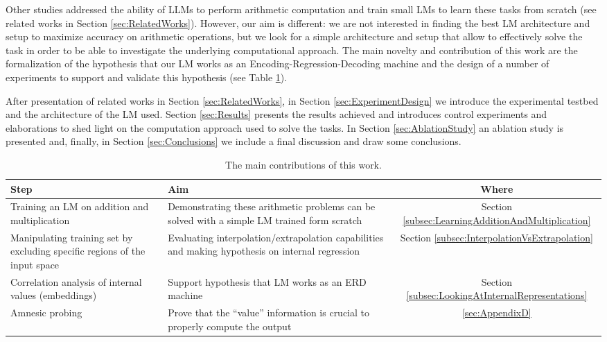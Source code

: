 \documentclass[final,1p,times,authoryear]{elsarticle}
\begin{document}
Other studies addressed the ability of LLMs to perform arithmetic computation and train small LMs to learn these tasks from scratch (see related works in Section \ref{sec:RelatedWorks}). However, our aim is different: we are not interested in finding the best LM architecture and setup to maximize accuracy on arithmetic operations, but we look for a simple architecture and setup that allow to effectively solve the task in order to be able to investigate the underlying computational approach. The main novelty and contribution of this work are the formalization of the hypothesis that our LM works as an Encoding-Regression-Decoding machine and the design of a number of experiments to support and validate this hypothesis (see Table \ref{table:InvestigationSteps}).

After presentation of related works in Section \ref{sec:RelatedWorks}, in Section \ref{sec:ExperimentDesign} we introduce the experimental testbed and the architecture of the LM used. Section \ref{sec:Results} presents the results achieved and introduces control experiments and elaborations to shed light on the computation approach used to solve the tasks. In Section \ref{sec:AblationStudy} an ablation study is presented and, finally, in Section \ref{sec:Conclusions} we include a final discussion and draw some conclusions.

\begin{table}[h!]
\caption{The main contributions of this work.}
\label{table:InvestigationSteps}
\begin{center}
\begin{tabular}{ |p{5cm}|p{5cm}|c| } 
 \hline
 \textbf{Step} & \textbf{Aim} & \textbf{Where} \\
 \hline
 Training an LM on addition and multiplication & Demonstrating these arithmetic problems can be solved with a simple LM trained form scratch & Section \ref{subsec:LearningAdditionAndMultiplication} \\
 \hline
 Manipulating training set by excluding specific regions of the input space & Evaluating interpolation/extrapolation capabilities and making hypothesis on internal regression & Section \ref{subsec:InterpolationVsExtrapolation} \\
 \hline
 Correlation analysis of internal values (embeddings) & Support hypothesis that LM works as an ERD machine & Section \ref{subsec:LookingAtInternalRepresentations} \\
 \hline
 Amnesic probing & Prove that the “value” information is crucial to properly compute the output & \ref{sec:AppendixD} \\
 \hline
\end{tabular}
\end{center}
\end{table}
\end{document}
